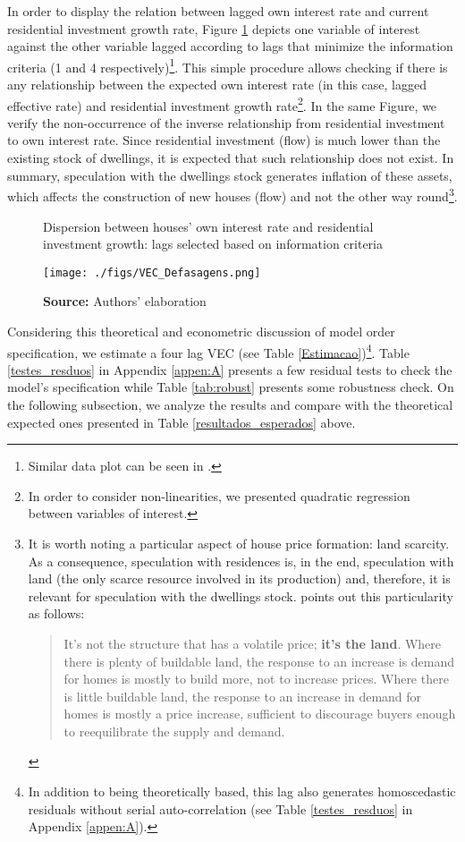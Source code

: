\documentclass[12pt, a4paper]{article}
\begin{document}
In order to display the relation between lagged own interest rate and current residential investment growth rate, Figure \ref{defasagens} depicts one variable of interest against the other variable lagged according to lags that minimize the information criteria (1 and 4 respectively)\footnote{Similar data plot can be seen in \textcite[p.~16]{girardi_autonomous_2015}.}.
This simple procedure allows checking if there is any relationship between the expected own interest rate (in this case, lagged effective rate) and residential investment growth rate\footnote{In order to consider non-linearities, we presented quadratic regression between variables of interest.}.
In the same Figure, we verify the non-occurrence of the inverse relationship from residential investment to own interest rate.
Since residential investment (flow) is much lower than the existing stock of dwellings, it is expected that such relationship does not exist.
In summary, speculation with the dwellings stock generates inflation of these assets, which affects the construction of new houses (flow) and not the other way round\footnote{It is worth noting a particular aspect of house price formation: land scarcity. As a consequence, speculation with residences is, in the end, speculation with land (the only scarce resource involved in its production) and, therefore, it is relevant for speculation with the dwellings stock. 
	\textcite[p.~349, emphasis added]{leamer_housing_2007} points out this particularity as follows:
	\begin{quotation}
		It’s not the structure that has a volatile price; \textbf{it's the land}. Where there is plenty of buildable land, the response to an increase is demand for homes is mostly to build more, not to increase prices. Where there is little buildable land, the response to an increase in demand for homes is mostly a price increase, sufficient to discourage buyers enough to reequilibrate the supply and demand.
	\end{quotation}}.

\begin{figure}
	\centering
	\caption{Dispersion between houses' own interest rate and residential investment growth: lags selected based on information criteria}
	\label{defasagens}
	\texttt{[image: ./figs/VEC\_Defasagens.png]}
	\caption*{\textbf{Source:} Authors' elaboration}
\end{figure}

Considering this theoretical and econometric discussion of model order specification, we estimate a four lag VEC  (see Table \ref{Estimacao})\footnote{In addition to being theoretically based, this lag also generates homoscedastic residuals without serial auto-correlation (see Table \ref{testes_resduos} in Appendix \ref{appen:A}).}. 
Table \ref{testes_resduos} in Appendix \ref{appen:A} presents a few residual tests to check the model's specification while Table \ref{tab:robust} presents some robustness check.
On the following subsection, we analyze the results and compare with the theoretical expected ones presented in Table \ref{resultados_esperados} above.  
\end{document}
